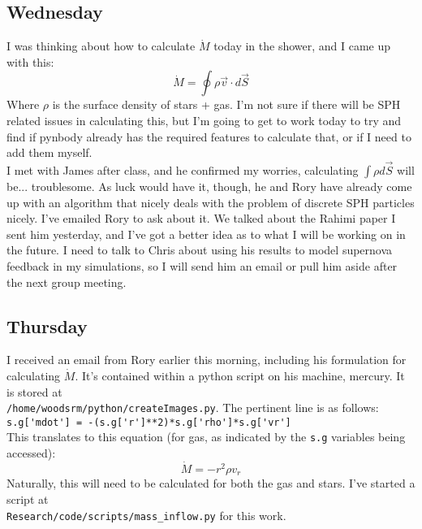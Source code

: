 \documentclass[11pt,letterpaper]{article}
\begin{document}
\subsection*{Wednesday}
I was thinking about how to calculate $\dot M$ today in the shower, and I came
up with this:
$$\dot M = \oint \rho \vec v \cdot d\vec S$$
Where $\rho$ is the surface density of stars + gas.  I'm not sure if there
will be SPH related issues in calculating this, but I'm going to get to work 
today to try and find if pynbody already has the required features to calculate
that, or if I need to add them myself.\\
I met with James after class, and he confirmed my worries, calculating 
$\int\rho d\vec S$ will be... troublesome.  As luck would have it, though, he 
and Rory have already come up with an algorithm that nicely deals with the 
problem of discrete SPH particles nicely.  I've emailed Rory to ask about it.
We talked about the Rahimi paper I sent him yesterday, and I've got a better
idea as to what I will be working on in the future.  I need to talk to Chris
about using his results to model supernova feedback in my simulations, so I
will send him an email or pull him aside after the next group meeting.
\subsection*{Thursday}
I received an email from Rory earlier this morning, including his formulation
for calculating $\dot M$.  It's contained within a python script on his machine,
mercury.  It is stored at\\ \verb!/home/woodsrm/python/createImages.py!.  The 
pertinent line is as follows:\\
\verb!s.g['mdot'] = -(s.g['r']**2)*s.g['rho']*s.g['vr']!\\
This translates to this equation (for gas, as indicated by the \verb!s.g! 
variables being accessed):
$$\dot M = -r^2\rho v_r$$
Naturally, this will need to be calculated for both the gas and stars.  I've
started a script at\\ \verb!Research/code/scripts/mass_inflow.py! for this work.
\end{document}
